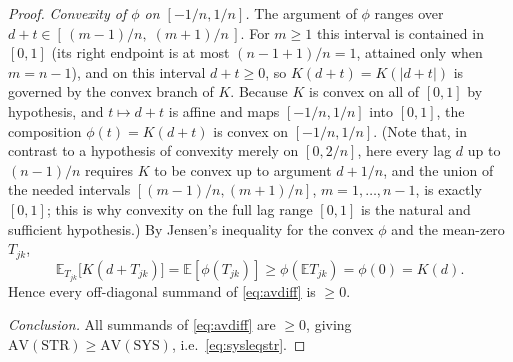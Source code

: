 \documentclass{amsart}
\theoremstyle{definition}
\newcommand{\E}{\mathbb{E}}
\begin{document}
\begin{proof}
\emph{Convexity of $\phi$ on $[-1/n,1/n]$.} The argument of $\phi$ ranges
over $d+t\in[\,(m-1)/n,\;(m+1)/n\,]$. For $m\ge1$ this interval is contained
in $[0,1]$ (its right endpoint is at most $(n-1+1)/n=1$, attained only when
$m=n-1$), and on this interval $d+t\ge0$, so $K(d+t)=K(|d+t|)$ is governed by the convex branch of $K$.
Because $K$ is convex on all of $[0,1]$ by hypothesis, and $t\mapsto d+t$ is
affine and maps $[-1/n,1/n]$ into $[0,1]$, the composition
$\phi(t)=K(d+t)$ is convex on $[-1/n,1/n]$. (Note that, in contrast to a
hypothesis of convexity merely on $[0,2/n]$, here every lag $d$ up to
$(n-1)/n$ requires $K$ to be convex up to argument $d+1/n$, and the union
of the needed intervals $[(m-1)/n,(m+1)/n]$, $m=1,\dots,n-1$, is exactly
$[0,1]$; this is why convexity on the full lag range $[0,1]$ is the natural
and sufficient hypothesis.) By Jensen's inequality for the convex $\phi$
and the mean-zero $T_{jk}$,
\[
\E_{T_{jk}}\big[K(d+T_{jk})\big]=\E[\phi(T_{jk})]\ge
\phi(\E T_{jk})=\phi(0)=K(d).
\]
Hence every off-diagonal summand of \eqref{eq:avdiff} is $\ge0$.

\emph{Conclusion.} All summands of \eqref{eq:avdiff} are $\ge0$, giving
$\mathrm{AV}(\mathrm{STR})\ge\mathrm{AV}(\mathrm{SYS})$, i.e.\
\eqref{eq:sysleqstr}.
\end{proof}
\end{document}
